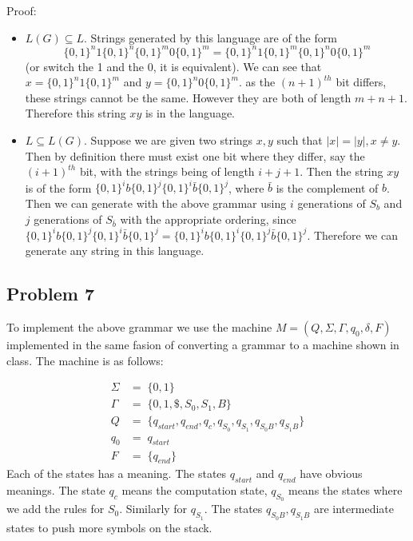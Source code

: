 \documentclass[english]{article}
\begin{document}
Proof:
\begin{itemize}
\item \(L(G) \subseteq L\). Strings generated by this language are of the form
 \[\{0,1\}^n 1 \{0,1\}^n \{0,1\}^m 0 \{0,1\}^m = \{0,1\}^n 1 \{0,1\}^m \{0,1\}^n 0 \{0,1\}^m\] 
 (or switch the 1 and the 0, it is equivalent). We can see that \(x = \{0,1\}^n 1 \{0,1\}^m\) and
 \(y = \{0,1\}^n 0 \{0,1\}^m\). as the $(n+1)^{th}$ bit differs, these strings cannot be the same.
  However they are both of length $m+n+1$. Therefore this string $xy$ is in the language.
\item \(L \subseteq L(G)\). Suppose we are given two strings $x, y$ such that $|x| = |y|, x \neq y$. Then by
 definition there must exist one bit where they differ, say the $(i+1)^{th}$ bit, with the strings being of
 length $i+j+1$. Then the string $xy$ is of the form \( \{0,1\}^i b \{0,1\}^j \{0,1\}^i \bar{b} \{0,1\}^j \),
 where $\bar{b}$ is the complement of $b$. Then we can generate with the above grammar using $i$ generations
 of $S_b$ and $j$ generations of  $S_{\bar{b}}$ with the appropriate ordering, since 
 \( \{0,1\}^i b \{0,1\}^j \{0,1\}^i \bar{b} \{0,1\}^j = \{0,1\}^i b \{0,1\}^i \{0,1\}^j \bar{b} \{0,1\}^j \).
 Therefore we can generate any string in this language.
\end{itemize}

\subsection*{Problem 7}
To implement the above grammar we use the machine \(M = (Q,\Sigma,\Gamma,q_0,\delta,F)\) implemented in
the same fasion of converting a grammar to a machine shown in class. The machine is as follows:

\begin{align*}
\Sigma &=\; \{0,1\} \\
\Gamma &=\; \{0,1,\$,S_0,S_1,B\} \\
   Q   &=\; \{q_{start},q_{end},q_{c},q_{S_0},q_{S_1},q_{S_0B},q_{S_1B}\} \\
  q_0  &=\; q_{start} \\
   F   &=\; \{q_{end}\}
\end{align*}
Each of the states has a meaning. The states $q_{start}$ and $q_{end}$ have obvious meanings. The state
$q_c$ means the computation state, $q_{S_0}$ means the states where we add the rules for $S_0$. Similarly
for $q_{S_1}$. The states $q_{S_0B},q_{S_1B}$ are intermediate states to push more symbols on the stack.
\end{document}
